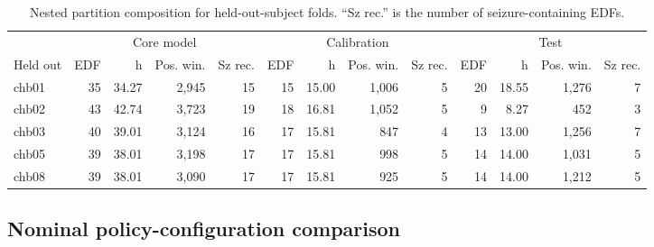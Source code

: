 \documentclass[11pt,a4paper]{article}
\begin{document}
\begin{table}[H]
\centering
\caption{Nested partition composition for held-out-subject folds. ``Sz rec.'' is the number of seizure-containing EDFs.}
\label{tab:partition_loso}
\scriptsize
\setlength{\tabcolsep}{3.5pt}
\renewcommand{\arraystretch}{1.12}
\begin{tabular}{lrrrrrrrrrrrr}
\toprule
& \multicolumn{4}{c}{Core model} & \multicolumn{4}{c}{Calibration} & \multicolumn{4}{c}{Test} \\
\cmidrule(lr){2-5}\cmidrule(lr){6-9}\cmidrule(lr){10-13}
Held out & EDF & h & Pos. win. & Sz rec. & EDF & h & Pos. win. & Sz rec. & EDF & h & Pos. win. & Sz rec. \\
\midrule
chb01 & 35 & 34.27 & 2,945 & 15 & 15 & 15.00 & 1,006 & 5 & 20 & 18.55 & 1,276 & 7 \\
chb02 & 43 & 42.74 & 3,723 & 19 & 18 & 16.81 & 1,052 & 5 & 9 & 8.27 & 452 & 3 \\
chb03 & 40 & 39.01 & 3,124 & 16 & 17 & 15.81 & 847 & 4 & 13 & 13.00 & 1,256 & 7 \\
chb05 & 39 & 38.01 & 3,198 & 17 & 17 & 15.81 & 998 & 5 & 14 & 14.00 & 1,031 & 5 \\
chb08 & 39 & 38.01 & 3,090 & 17 & 17 & 15.81 & 925 & 5 & 14 & 14.00 & 1,212 & 5 \\
\bottomrule
\end{tabular}
\end{table}
\FloatBarrier

\subsection{Nominal policy-configuration comparison}
\end{document}
